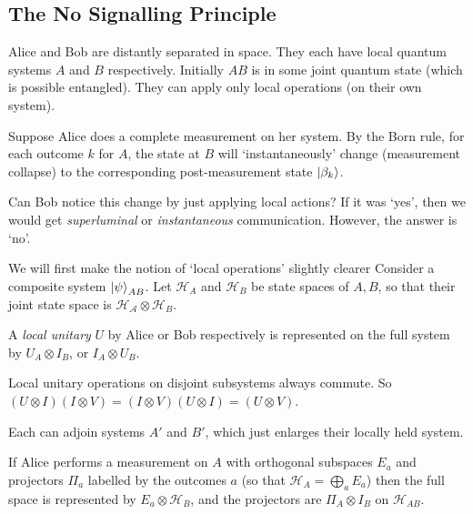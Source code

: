 \documentclass[a4paper]{article}
\begin{document}
\subsection{The No Signalling Principle}

Alice and Bob are distantly separated in space. They each have local quantum systems $A$ and $B$ respectively. Initially $AB$ is in some joint quantum state (which is possible entangled). They can apply only local operations (on their own system).

Suppose Alice does a complete measurement on her system. 
By the Born rule, for each outcome $k$ for $A$, the state at $B$ will `instantaneously' change (measurement collapse) to the corresponding post-measurement state $\ket{\beta_k}$.

Can Bob notice this change by just applying local actions?
If it was `yes', then we would get \emph{superluminal} or \emph{instantaneous} communication.
However, the answer is `no'.

We will first make the notion of `local operations' slightly clearer Consider a composite system $\ket{\psi}_{AB}$. Let $\mathcal{H}_A$ and $\mathcal{H}_B$ be state spaces of $A, B$, so that their joint state space is $\mathcal{H_A} \otimes \mathcal{H}_B$.

\begin{definition}
	A \emph{local unitary} $U$ by Alice or Bob respectively is represented on the full system by $U_A \otimes I_B$, or $I_A \otimes U_B$.
\end{definition}

\begin{remark}
	Local unitary operations on disjoint subsystems always commute.
	So $(U \otimes I)(I \otimes V) = (I \otimes V)(U \otimes I) = (U \otimes V)$.
\end{remark}

\begin{definition}
	Each can adjoin  systems $A'$ and $B'$, which just enlarges their locally held system.
\end{definition}

\begin{definition}
	If Alice performs a measurement on $A$ with orthogonal subspaces 
	$E_a$ and projectors $\Pi_a$ labelled by the outcomes $a$ (so that $\mathcal{H}_A = \bigoplus_{a} E_a$) then the full space is represented by $E_a \otimes \mathcal{H}_B$, and the projectors are $\Pi_A \otimes I_B$ on $\mathcal{H}_{AB}$.
\end{definition}
\end{document}
